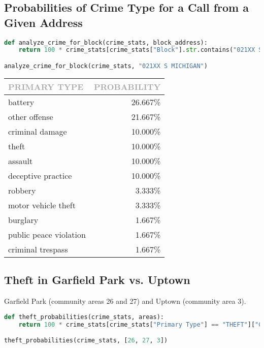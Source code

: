 \documentclass[11pt]{article}
\newcommand{\printsubsection}[1]{\normalfont\headerfontlt\textcolor{darkgray}{{#1}}}
\newcommand{\opns}[1]{\textrm{\small\printsubsection{\MakeUppercase{#1}}}}
\begin{document}
\subsection{Probabilities of Crime Type for a Call from a Given Address}
\begin{lstlisting}[language=Python, numbers=none]
def analyze_crime_for_block(crime_stats, block_address):
    return 100 * crime_stats[crime_stats["Block"].str.contains("021XX S MICHIGAN")]["Primary Type"].value_counts(normalize=True)

analyze_crime_for_block(crime_stats, "021XX S MICHIGAN")
\end{lstlisting}
\begin{table}[H]
\centering \renewcommand{\arraystretch}{1.2}
\begin{tabular}{l|r}
\opns{Primary Type} &  \opns{Probability} \\\hline
battery                &     26.667\% \\
other offense          &     21.667\% \\
criminal damage        &     10.000\% \\
theft                  &     10.000\% \\
assault                &     10.000\% \\
deceptive practice     &     10.000\% \\
robbery                &      3.333\% \\
motor vehicle theft    &      3.333\% \\
burglary               &      1.667\% \\
public peace violation &      1.667\% \\
criminal trespass      &      1.667\% \\
\end{tabular}
\end{table}

\subsection{Theft in Garfield Park vs. Uptown}
Garfield Park (community areas 26 and 27) and Uptown (community area 3).

\begin{lstlisting}[language=Python,numbers=none]
def theft_probabilities(crime_stats, areas):
    return 100 * crime_stats[crime_stats["Primary Type"] == "THEFT"]["Community Area"].value_counts(normalize=True)[[float(a) for a in areas]]

theft_probabilities(crime_stats, [26, 27, 3])  
\end{lstlisting}
\end{document}
